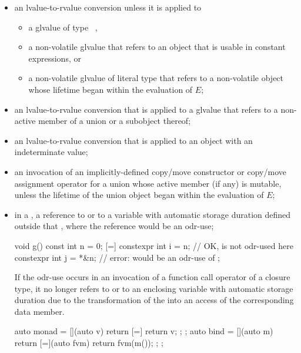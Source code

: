 \begin{itemize}
\item
an lvalue-to-rvalue conversion unless
it is applied to
\begin{itemize}
  \item
  a glvalue of type \cv{}~,

  \item
  a non-volatile glvalue that refers to an object that is
  usable in constant expressions, or

  \item
  a non-volatile glvalue of literal type that refers to a non-volatile object
  whose lifetime began within the evaluation of $E$;
\end{itemize}

\item
an lvalue-to-rvalue conversion
that is applied to a glvalue
that refers to a non-active member of a union or a subobject thereof;

\item
an lvalue-to-rvalue conversion that is applied to
an object with an indeterminate value;

\item
an invocation of an implicitly-defined copy/move constructor or
copy/move assignment operator
for a union whose active member (if any) is mutable,
unless the lifetime of the union object began within the evaluation of $E$;

\item
in a ,
a reference to  or to a variable with
automatic storage duration defined outside that
, where
the reference would be an odr-use;
\begin{example}
\begin{codeblock}
void g() {
  const int n = 0;
  [=] {
    constexpr int i = n;        // OK,  is not odr-used here
    constexpr int j = *&n;      // error:  would be an odr-use of 
  };
}
\end{codeblock}
\end{example}
\begin{note}
If the odr-use occurs in an invocation
of a function call operator of a closure type,
it no longer refers to  or to an enclosing
variable with automatic storage duration
due to the transformation
of the  into
an access of the corresponding data member.
\begin{example}
\begin{codeblock}
auto monad = [](auto v) { return [=] { return v; }; };
auto bind = [](auto m) {
  return [=](auto fvm) { return fvm(m()); };
};


\end{codeblock}
\end{example}
\end{note}
\end{itemize}
